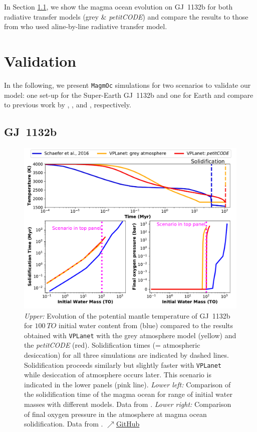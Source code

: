 \documentclass[oneside,twocolumn]{article}
\newcommand{\vplanet}{\texttt{\footnotesize{VPLanet}}}
\newcommand{\magmoc}{\texttt{\footnotesize{MagmOc}}}
\newcommand{\petit}{\textit{petitCODE}}
\begin{document}
In Section \ref{sec_res_GJ}, we show the magma ocean evolution on GJ~1132b for both radiative transfer models (grey \& \petit{}) and compare the results to those from \citet{Schaefer2016} who used aline-by-line radiative transfer model.

\section{Validation}
\label{chap_validation}
In the following, we present \magmoc{} simulations for two scenarios to validate our model: one set-up for the Super-Earth GJ~1132b and one for Earth and compare to previous work by \citet{Schaefer2016}, \citet{Elkins-Tanton2008}, and \citet{Hamano2013}, respectively.

\subsection{GJ~1132b}
\label{sec_res_GJ}

\begin{figure}[ht]
    \centering
    \includegraphics[width=\textwidth]{BarthFig2.pdf}
    \caption{\textit{Upper:} Evolution of the potential mantle temperature of GJ~1132b for $\SI{100}{TO}$ initial water content from \citet[Fig. 4]{Schaefer2016} (blue) compared to the results obtained with \vplanet{} with the grey atmosphere model (yellow) and the \petit{} (red). Solidification times (= atmospheric desiccation) for all three simulations are indicated by dashed lines. Solidification proceeds similarly but slightly faster with \vplanet{} while desiccation of atmosphere occurs later. This scenario is indicated in the lower panels (pink line). \textit{Lower left:} Comparison of the solidification time of the magma ocean for range of initial water masses with different models. Data from \citet[Fig. 5]{Schaefer2016}. \textit{Lower right:} Comparison of final oxygen pressure in the atmosphere at magma ocean solidification. Data from \citet[Fig. 7]{Schaefer2016}.
    \href{https://github.com/pbfeu/Trappist1_MagmOc/tree/public/Fig_Temp_GJ1132b}{$\nearrow$GitHub}
    }
    \label{GJ1132b_VPLanet_Schaefer}
\end{figure}
\end{document}
